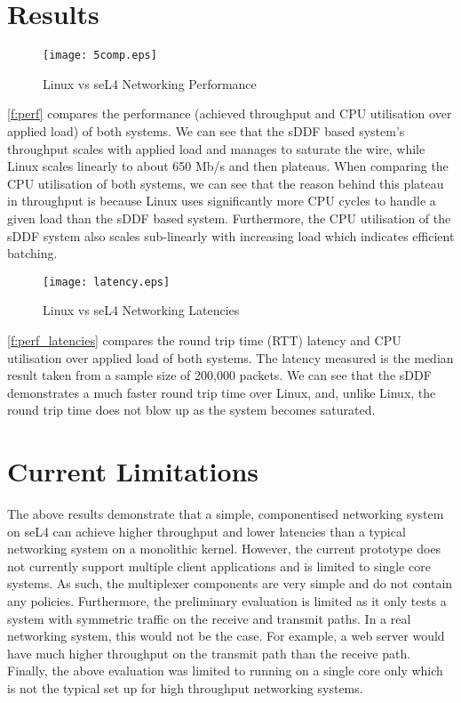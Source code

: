 \section{Results}

\begin{figure}[h]
    \centering
    \texttt{[image: 5comp.eps]}
    \caption{Linux vs seL4 Networking Performance}
    \label{f:perf}
\end{figure}

\autoref{f:perf} compares the performance (achieved throughput and CPU utilisation over applied load) of both systems. 
We can see that the sDDF based system's throughput scales with applied load and manages to saturate the wire, while
Linux scales linearly to about 650 Mb/s and then plateaus. When comparing the CPU utilisation of both systems, we
can see that the reason behind this plateau in throughput is because Linux uses significantly more CPU cycles 
to handle a given load than the sDDF based system. Furthermore, the CPU utilisation of the sDDF system also scales 
sub-linearly with increasing load which indicates efficient batching.

\begin{figure}[h]
    \centering
    \texttt{[image: latency.eps]}
    \caption{Linux vs seL4 Networking Latencies}
    \label{f:perf_latencies}
\end{figure}

\autoref{f:perf_latencies} compares the round trip time (RTT) latency and CPU utilisation over applied load of both systems. The latency measured
is the median result taken from a sample size of 200,000 packets. We can see that the sDDF demonstrates a much faster round trip time over Linux, 
and, unlike Linux, the round trip time does not blow up as the system becomes saturated. 

\section{Current Limitations}
The above results demonstrate that a simple, componentised networking system on seL4 can achieve higher throughput and lower latencies than a typical
networking system on a monolithic kernel. However, the current prototype does not currently support multiple client applications and 
is limited to single core systems. As such, the multiplexer components are very simple and do not contain any policies. Furthermore, the 
preliminary evaluation is limited as it only tests a system with symmetric traffic on the receive and transmit paths. In a real
networking system, this would not be the case. For example, a web server would have much higher throughput on the transmit path than the receive path.
Finally, the above evaluation was limited to running on a single core only which is not the typical set up for high throughput networking systems.


